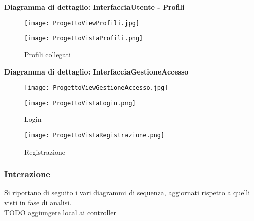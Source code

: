 \textbf{Diagramma di dettaglio: InterfacciaUtente - Profili}
\begin{figure}[h!]
    \begin{center}
        \texttt{[image: ProgettoViewProfili.jpg]}
    \end{center}
\end{figure}

\begin{figure}[h!]
    \centering
    \texttt{[image: ProgettoVistaProfili.png]}
    \caption{Profili collegati}
\end{figure}

\newpage

\textbf{Diagramma di dettaglio: InterfacciaGestioneAccesso}

\begin{figure}[h!]
    \begin{center}
        \texttt{[image: ProgettoViewGestioneAccesso.jpg]}
    \end{center}
\end{figure}

\begin{figure}[h!]
    \centering
    \texttt{[image: ProgettoVistaLogin.png]}
    \caption{Login}
\end{figure}
\begin{figure}[h!]
    \centering
    \texttt{[image: ProgettoVistaRegistrazione.png]}
    \caption{Registrazione}
\end{figure}

\clearpage

\subsubsection{Interazione}



Si riportano di seguito i vari diagrammi di sequenza, aggiornati rispetto a quelli visti in fase di analisi.\\
TODO aggiungere local ai controller
\vspace{3em}

